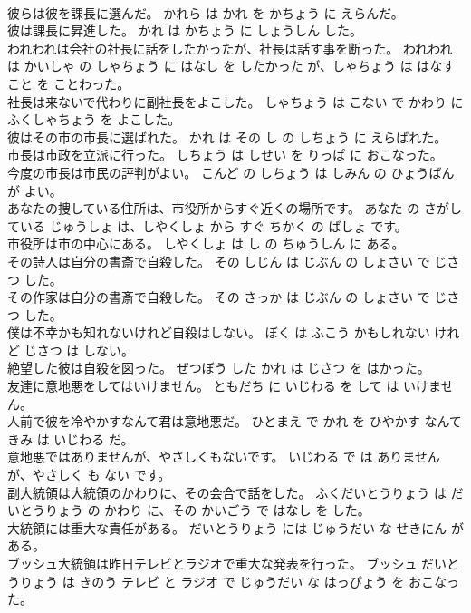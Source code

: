 \documentclass[8pt]{extreport}
\begin{document}
\begin{CJK}{UTF8}{min}
\\	彼らは彼を課長に選んだ。	かれら は かれ を かちょう に えらんだ。	
\\	彼は課長に昇進した。	かれ は かちょう に しょうしん した。	
\\	われわれは会社の社長に話をしたかったが、社長は話す事を断った。	われわれ は かいしゃ の しゃちょう に はなし を したかった が、しゃちょう は はなす こと を ことわった。	
\\	社長は来ないで代わりに副社長をよこした。	しゃちょう は こない で かわり に ふくしゃちょう を よこした。	
\\	彼はその市の市長に選ばれた。	かれ は その し の しちょう に えらばれた。	
\\	市長は市政を立派に行った。	しちょう は しせい を りっぱ に おこなった。	
\\	今度の市長は市民の評判がよい。	こんど の しちょう は しみん の ひょうばん が よい。	
\\	あなたの捜している住所は、市役所からすぐ近くの場所です。	あなた の さがしている じゅうしょ は、しやくしょ から すぐ ちかく の ばしょ です。	
\\	市役所は市の中心にある。	しやくしょ は し の ちゅうしん に ある。	
\\	その詩人は自分の書斎で自殺した。	その しじん は じぶん の しょさい で じさつ した。	
\\	その作家は自分の書斎で自殺した。	その さっか は じぶん の しょさい で じさつ した。	
\\	僕は不幸かも知れないけれど自殺はしない。	ぼく は ふこう かもしれない けれど じさつ は しない。	
\\	絶望した彼は自殺を図った。	ぜつぼう した かれ は じさつ を はかった。	
\\	友達に意地悪をしてはいけません。	ともだち に いじわる を して は いけません。	
\\	人前で彼を冷やかすなんて君は意地悪だ。	ひとまえ で かれ を ひやかす なんて きみ は いじわる だ。	
\\	意地悪ではありませんが、やさしくもないです。	いじわる で は ありません が、やさしく も ない です。	
\\	副大統領は大統領のかわりに、その会合で話をした。	ふくだいとうりょう は だいとうりょう の かわり に、その かいごう で はなし を した。	
\\	大統領には重大な責任がある。	だいとうりょう には じゅうだい な せきにん が ある。	
\\	ブッシュ大統領は昨日テレビとラジオで重大な発表を行った。	ブッシュ だいとうりょう は きのう テレビ と ラジオ で じゅうだい な はっぴょう を おこなった。	

\end{CJK}
\end{document}
